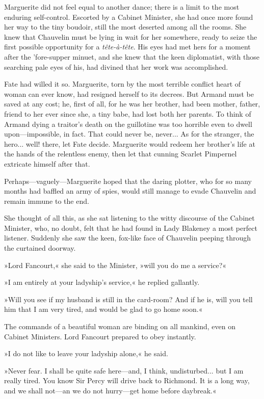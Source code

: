 Marguerite did not feel equal to another dance; there is a limit to the most enduring self-control. Escorted by a Cabinet Minister, she had once more found her way to the tiny boudoir, still the most deserted among all the rooms. She knew that Chauvelin must be lying in wait for her somewhere, ready to seize the first possible opportunity for a \textit{tête-à-tête}. His eyes had met hers for a moment after the 'fore-supper minuet, and she knew that the keen diplomatist, with those searching pale eyes of his, had divined that her work was accomplished.

Fate had willed it so. Marguerite, torn by the most terrible conflict heart of woman can ever know, had resigned herself to its decrees. But Armand must be saved at any cost; he, first of all, for he was her brother, had been mother, father, friend to her ever since she, a tiny babe, had lost both her parents. To think of Armand dying a traitor's death on the guillotine was too horrible even to dwell upon\allowbreak---\allowbreak impossible, in fact. That could never be, never... As for the stranger, the hero... well! there, let Fate decide. Marguerite would redeem her brother's life at the hands of the relentless enemy, then let that cunning Scarlet Pimpernel extricate himself after that.

Perhaps\allowbreak---\allowbreak vaguely\allowbreak---\allowbreak Marguerite hoped that the daring plotter, who for so many months had baffled an army of spies, would still manage to evade Chauvelin and remain immune to the end.

She thought of all this, as she sat listening to the witty discourse of the Cabinet Minister, who, no doubt, felt that he had found in Lady Blakeney a most perfect listener. Suddenly she saw the keen, fox-like face of Chauvelin peeping through the curtained doorway.

»Lord Fancourt,« she said to the Minister, »will you do me a service?«

»I am entirely at your ladyship's service,« he replied gallantly.

»Will you see if my husband is still in the card-room? And if he is, will you tell him that I am very tired, and would be glad to go home soon.«

The commands of a beautiful woman are binding on all mankind, even on Cabinet Ministers. Lord Fancourt prepared to obey instantly.

»I do not like to leave your ladyship alone,« he said.

»Never fear. I shall be quite safe here\allowbreak---\allowbreak and, I think, undisturbed... but I am really tired. You know Sir Percy will drive back to Richmond. It is a long way, and we shall not\allowbreak---\allowbreak an we do not hurry\allowbreak---\allowbreak get home before daybreak.«

